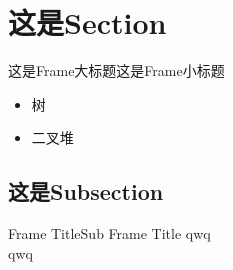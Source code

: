 \section{这是Section}
\begin{frame}[t]{这是Frame大标题}{这是Frame小标题}
	\begin{itemize}
		\item 树 
		\item 二叉堆 
	\end{itemize}
\end{frame}

\subsection{这是Subsection}
\begin{frame}[t]{Frame Title}{Sub Frame Title}
	qwq\\
	qwq
\end{frame}